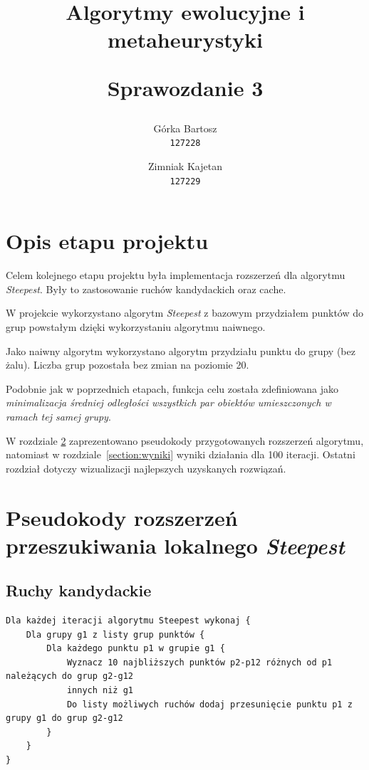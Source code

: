 \documentclass[main.tex]{subfiles}
\begin{document}
\title{
    \textbf{Algorytmy ewolucyjne i metaheurystyki}\\
    \begin{large}
        Sprawozdanie 3
    \end{large}
}

\author{
    Górka Bartosz\\
  \texttt{127228}
  \and
  Zimniak Kajetan\\
  \texttt{127229}
}

\date{}

\maketitle

\section{Opis etapu projektu}
Celem kolejnego etapu projektu była implementacja rozszerzeń dla algorytmu \textit{Steepest}. Były to zastosowanie ruchów kandydackich oraz cache.

W projekcie wykorzystano algorytm \textit{Steepest} z bazowym przydziałem punktów do grup powstałym dzięki wykorzystaniu algorytmu naiwnego.

Jako naiwny algorytm wykorzystano algorytm przydziału punktu do grupy (bez żalu). Liczba grup pozostała bez zmian na poziomie 20.

Podobnie jak w poprzednich etapach, funkcja celu została zdefiniowana jako \textit{minimalizacja średniej odległości wszystkich par obiektów umieszczonych w ramach tej samej grupy}.

W rozdziale \ref{section:pseudokody} zaprezentowano pseudokody przygotowanych rozszerzeń algorytmu, natomiast w rozdziale\leavevmode\nobreak\ \ref{section:wyniki} wyniki działania dla 100 iteracji. Ostatni rozdział dotyczy wizualizacji najlepszych uzyskanych rozwiązań.

\section{Pseudokody rozszerzeń przeszukiwania lokalnego \textit{Steepest}}
\label{section:pseudokody}
\subsection{Ruchy kandydackie}
\begin{verbatim}
Dla każdej iteracji algorytmu Steepest wykonaj {
    Dla grupy g1 z listy grup punktów {
        Dla każdego punktu p1 w grupie g1 {
            Wyznacz 10 najbliższych punktów p2-p12 różnych od p1 należących do grup g2-g12 
            innych niż g1
            Do listy możliwych ruchów dodaj przesunięcie punktu p1 z grupy g1 do grup g2-g12
        }
    }
}
\end{verbatim}
\end{document}
